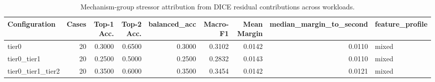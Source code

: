 \begin{table}[t]
\centering
\caption{Mechanism-group stressor attribution from DICE residual contributions across workloads.}
\label{tab:dice_stressor_diagnosis}
\footnotesize
\begin{tabular}{lrrrrrrrl}
\toprule
Configuration & Cases & Top-1 Acc. & Top-2 Acc. & balanced_acc & Macro-F1 & Mean Margin & median_margin_to_second & feature_profile \\
\midrule
tier0 & 20 & 0.3000 & 0.6500 & 0.3000 & 0.3102 & 0.0142 & 0.0110 & mixed \\
tier0_tier1 & 20 & 0.2500 & 0.5000 & 0.2500 & 0.2832 & 0.0143 & 0.0110 & mixed \\
tier0_tier1_tier2 & 20 & 0.3500 & 0.6000 & 0.3500 & 0.3454 & 0.0142 & 0.0121 & mixed \\
\bottomrule
\end{tabular}

\end{table}
